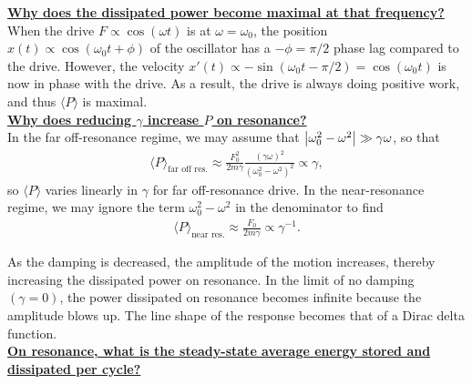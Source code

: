 \documentclass{book}
\theoremstyle{definition}
\newcommand{\f}[2]{\frac{#1}{#2}}
\begin{document}
\noindent \textbf{\underline{Why does the dissipated power become maximal at that frequency?} } \\


When the drive $F \propto \cos (\omega t)$ is at $\omega = \omega_0$, the position $x(t) \propto \cos(\omega_0 t + \phi)$ of the oscillator has a $-\phi =\pi/2$ phase lag compared to the drive. However, the velocity $x'(t) \propto -\sin(\omega_0 t -\pi/2) = \cos(\omega_0 t)$ is now in phase with the drive. As a result, the drive is always doing positive work, and thus $\langle P \rangle$ is maximal.  \\







\noindent \textbf{\underline{Why does reducing $\gamma$ increase $P$ on resonance?}}\\

In the far off-resonance regime, we may assume that $\abs{\omega_0^2 - \omega^2}\gg \gamma \omega$, so that 
\begin{align*}
\langle P \rangle_\text{far off res.}  \approx   \f{F_0^2}{2m\gamma} \f{(\gamma \omega)^2}{(\omega_0^2 - \omega^2)^2} \propto \gamma,
\end{align*}
so $\langle P \rangle$ varies linearly in $\gamma$ for far off-resonance drive. In the near-resonance regime, we may ignore the term $\omega_0^2 - \omega^2$ in the denominator to find 
\begin{align*}
\langle P \rangle_\text{near res.} \approx \f{F_0}{2m\gamma} \propto \gamma^{-1}.
\end{align*}


As the damping is decreased, the amplitude of the motion increases, thereby increasing the dissipated power on resonance. In the limit of no damping $(\gamma = 0)$, the power dissipated on resonance becomes infinite because the amplitude blows up. The line shape of the response becomes that of a Dirac delta function. \\




\noindent \textbf{\underline{On resonance, what is the steady-state average energy stored and dissipated per cycle?}}\\
\end{document}
